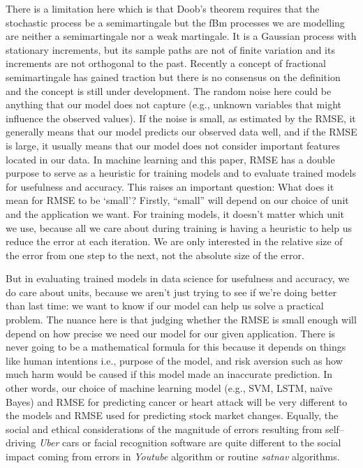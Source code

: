 \documentclass[12pt,a4paper]{report}
\numberwithin{equation}{section}
\begin{document}
There is a limitation here which is that Doob's theorem requires that
the stochastic process be a semimartingale but the fBm processes we are
modelling are neither a semimartingale nor a weak martingale. It is a
Gaussian process with stationary increments, but its sample paths are
not of finite variation and its increments are not orthogonal to the
past. Recently a concept of fractional semimartingale has gained
traction but there is no consensus on the definition and the concept is
still under development. The random noise here could be anything that
our model does not capture (e.g., unknown variables that might influence
the observed values). If the noise is small, as estimated by the RMSE,
it generally means that our model predicts our observed data well, and
if the RMSE is large, it usually means that our model does not consider
important features located in our data. In machine learning and this
paper, RMSE has a double purpose to serve as a heuristic for training
models and to evaluate trained models for usefulness and accuracy. This
raises an important question: What does it mean for RMSE to be `small'?
Firstly, ``small'' will depend on our choice of unit and the application
we want. For training models, it doesn't matter which unit we use,
because all we care about during training is having a heuristic to help
us reduce the error at each iteration. We are only interested in the
relative size of the error from one step to the next, not the absolute
size of the error.

But in evaluating trained models in data science for usefulness and
accuracy, we do care about units, because we aren't just trying to see
if we're doing better than last time: we want to know if our model can
help us solve a practical problem. The nuance here is that judging
whether the RMSE is small enough will depend on how precise we need our
model for our given application. There is never going to be a
mathematical formula for this because it depends on things like human
intentions i.e., purpose of the model, and risk aversion such as how
much harm would be caused if this model made an inaccurate prediction.
In other words, our choice of machine learning model (e.g., SVM, LSTM,
naïve Bayes) and RMSE for predicting cancer or heart attack will be very
different to the models and RMSE used for predicting stock market
changes. Equally, the social and ethical considerations of the magnitude
of errors resulting from self--driving \emph{Uber} cars or facial
recognition software are quite different to the social impact coming
from errors in \emph{Youtube} algorithm or routine \emph{satnav}
algorithms.
\end{document}
